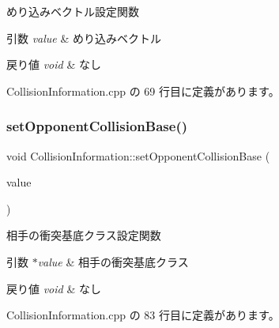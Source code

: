 めり込みベクトル設定関数 


\begin{DoxyParams}{引数}
{\em value} & めり込みベクトル \\
\hline
\end{DoxyParams}

\begin{DoxyRetVals}{戻り値}
{\em void} & なし \\
\hline
\end{DoxyRetVals}


 Collision\+Information.\+cpp の 69 行目に定義があります。

\mbox{\label{class_collision_information_a57cff995a5a2ee46e518daeb0440984a}} 
\subsubsection{\texorpdfstring{set\+Opponent\+Collision\+Base()}{setOpponentCollisionBase()}}
{\footnotesize\ttfamily void Collision\+Information\+::set\+Opponent\+Collision\+Base (\begin{DoxyParamCaption}\item[{\mbox{\hyperlink{class_collision_base}{Collision\+Base}} $\ast$}]{value }\end{DoxyParamCaption})}



相手の衝突基底クラス設定関数 


\begin{DoxyParams}{引数}
{\em $\ast$value} & 相手の衝突基底クラス \\
\hline
\end{DoxyParams}

\begin{DoxyRetVals}{戻り値}
{\em void} & なし \\
\hline
\end{DoxyRetVals}


 Collision\+Information.\+cpp の 83 行目に定義があります。

\mbox{\label{class_collision_information_ab2b701b11e80756b1910f71516e24ef8}} 

